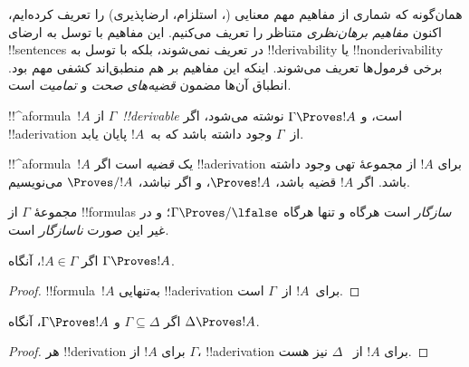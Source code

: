 \documentclass[../../../include/open-logic-section]{subfiles}
\begin{document}
      {}
      {}


\begin{explain}
همان‌گونه که شماری از مفاهیم مهم معنایی
(، استلزام، ارضاپذیری) را تعریف کرده‌ایم،
اکنون \emph{مفاهیم برهان‌نظری} متناظر را تعریف می‌کنیم. این مفاهیم با
توسل به ارضای !!{sentence}s در
 تعریف نمی‌شوند، بلکه با
توسل به !!{derivability} یا !!{nonderivability} برخی فرمول‌ها تعریف
می‌شوند. اینکه این مفاهیم بر هم منطبق‌اند کشفی مهم بود. انطباق آن‌ها
مضمون \emph{قضیه‌های صحت} و \emph{تمامیت} است.
\end{explain}

\begin{defn}[!!^{derivability}]
!!^a{formula}~$!A$ از $\Gamma$~\emph{!!{derivable}} است، و
$\Gamma \Proves !A$ نوشته می‌شود، اگر !!a{derivation} از~$\Gamma$ وجود
داشته باشد که به~$!A$ پایان یابد.
\end{defn}

\begin{defn}[قضیه‌ها]
!!^a{formula}~$!A$ یک \emph{قضیه} است اگر !!a{derivation} برای $!A$ از
مجموعهٔ تهی وجود داشته باشد. اگر $!A$ قضیه باشد، $\Proves !A$، و اگر
نباشد، $\Proves/ !A$ می‌نویسیم.
\end{defn}

\begin{defn}[سازگاری]
مجموعهٔ $\Gamma$ از !!{formula}s \emph{سازگار} است هرگاه و تنها هرگاه
$\Gamma\Proves/ \lfalse$؛ و در غیر این صورت \emph{ناسازگار} است.
\end{defn}

\begin{prop}
اگر $!A \in \Gamma$، آنگاه $\Gamma \Proves !A$.
\end{prop}

\begin{proof}
  !!{formula}~$!A$ به‌تنهایی !!a{derivation} برای~$!A$ از~$\Gamma$ است.
\end{proof}

\begin{prop}[یکنواختی]
اگر $\Gamma \subseteq \Delta$ و $\Gamma \Proves !A$، آنگاه
$\Delta \Proves !A$.
\end{prop}

\begin{proof}
هر !!{derivation} برای $!A$ از $\Gamma$، !!a{derivation} برای $!A$ از
~$\Delta$ نیز هست.
\end{proof}
\end{document}
